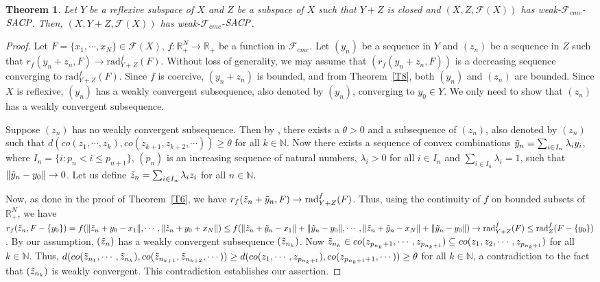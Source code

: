 \documentclass[11pt]{amsart}
\newtheorem{thm}{Theorem}[section]
\newcommand{\ra}{\rightarrow}
\newcommand{\ci}{\subseteq}
\newcommand{\la}{\lambda}
\newcommand{\Ti}{\Tilde}
\newcommand{\mb}{\mathbb}
\newcommand{\mc}{\mathcal}
\newcommand{\tr}{\textrm}
\newcommand{\mr}{\mathscr}
\newcommand{\trr}{\textrm{rad}}
\newcommand{\eSACP}{\bf{\emph{SACP}}}
\begin{document}
\begin{thm}
 Let $Y$ be a reflexive subspace of $X$ and $Z$ be a subspace of $X$ such that $Y+Z$ is closed and $(X,Z,\mc{F}(X))$ has weak-$\mr{F}_{cmc}$-$\eSACP$. Then, $(X,Y+Z,\mc{F}(X))$ has weak-$\mr{F}_{cmc}$-$\eSACP$.   
\end{thm}
\begin{proof}
Let $F=\{x_1,\cdots,x_N\}\in\mc{F}(X)$, $f:\mb{R}^N_+\ra\mb{R}_+$ be a function in $\mr{F}_{cmc}$. Let $(y_n)$ be a sequence in $Y$ and $(z_n)$ be a sequence in $Z$ such that $r_f(y_n+z_n,F)\ra\tr{rad}_{Y+Z}^f(F)$. Without loss of generality, we may assume that $(r_f(y_n+z_n,F))$ is a decreasing sequence converging to $\trr_{Y+Z}^f(F)$. Since $f$ is coercive, $(y_n+z_n)$ is bounded, and from Theorem~\ref{T8}, both $(y_n)$ and $(z_n)$ are bounded. Since $X$ is reflexive, $(y_n)$ has a weakly convergent subsequence, also denoted by $(y_n)$, converging to $y_0\in Y$. We only need to show that $(z_n)$ has a weakly convergent subsequence. 

Suppose $(z_n)$ has no weakly convergent subsequence. Then by \cite[Theorem~1]{RJ}, there exists a $\theta>0$ and a subsequence of $(z_n)$, also denoted by $(z_n)$ such that $d(co(z_1,\cdots,z_k),co(z_{k+1},z_{k+2},\cdots))\geq\theta$ for all $k\in\mb{N}$. Now there exists a sequence of convex combinations $\Ti{y}_n=\sum_{i\in I_n}\la_iy_i$, where $I_n=\{i:p_n<i\leq p_{n+1}\}$, $(p_n)$ is an increasing sequence of natural numbers, $\la_i>0$ for all $i\in I_n$ and $\sum_{i\in I_n}\la_i=1$, such that $\|\Ti{y}_n-y_0\|\ra0$. Let us define $\Ti{z}_n=\sum_{i\in I_n}\la_iz_i$ for all $n\in\mb{N}$. 

Now, as done in the proof of Theorem~\ref{T6}, we have $r_f(\Ti z_n+\Ti y_n,F)\ra\trr_{Y+Z}^f(F)$.
Thus, using the continuity of $f$ on bounded subsets of $\mb{R}^N_+$, we have $r_f(\Ti{z}_n,F-\{y_0\})=f(\|\Ti{z}_n+y_0-x_1\|,\cdots,\|\Ti{z}_n+y_0+x_N\|)\leq f(\|\Ti{z}_n+\Ti{y}_n-x_1\|+\|\Ti{y}_n-y_0\|,\cdots,\|\Ti{z}_n+\Ti{y}_n-x_N\|+\|\Ti{y}_n-y_0\|)\ra\trr_{Y+Z}^f(F)\leq\trr_Z^f(F-\{y_0\})$. By our assumption, $(\Ti{z}_n)$ has a weakly convergent subsequence $(\Ti{z}_{n_k})$. Now $\Ti{z}_{n_k}\in co(z_{{p_{n_k}}+1},\cdots,z_{p_{{n_k}+1}})\ci co(z_1,z_2,\cdots,z_{p_{n_k+1}})$ for all $k\in\mb{N}$. Thus, $d(co(\Ti{z}_{n_1},\cdots,\Ti{z}_{n_k}),co(\Ti{z}_{n_{k+1}},\Ti{z}_{{n_{k+2}}},\cdots))\geq d(co(z_1,\cdots,z_{p_{n_k+1}}),co(z_{p_{{n_k+1}}+1},\cdots))\geq\theta$ for all $k\in\mb{N}$, a contradiction to the fact that $(\Ti{z}_{n_k})$ is weakly convergent. This contradiction establishes our assertion.
\end{proof}
\end{document}
